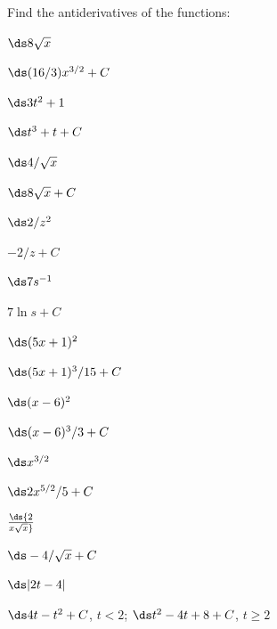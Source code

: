 \begin{enumialphparenastyle}

Find the antiderivatives of the functions:

\begin{ex}
 $\ds 8\sqrt{x}$
\begin{sol}
 $\ds (16/3)x^{3/2}+C$
\end{sol}
\end{ex}

\begin{ex}
 $\ds 3t^2+1$
\begin{sol}
 $\ds t^3+t+C$
\end{sol}
\end{ex}

\begin{ex}
 $\ds 4/\sqrt{x}$
\begin{sol}
 $\ds 8\sqrt{x}+C$
\end{sol}
\end{ex}

\begin{ex}
 $\ds 2/z^2$
\begin{sol}
 $-2/z+C$
\end{sol}
\end{ex}

\begin{ex}
 $\ds 7s^{-1}$
\begin{sol}
 $7\ln s+C$
\end{sol}
\end{ex}

\begin{ex}
 $\ds (5x+1)^2$
\begin{sol}
 $\ds (5x+1)^3/15+C$
\end{sol}
\end{ex}

\begin{ex}
 $\ds (x-6)^2$
\begin{sol}
 $\ds (x-6)^3/3+C$
\end{sol}
\end{ex}

\begin{ex}
 $\ds x^{3/2}$
\begin{sol}
 $\ds 2x^{5/2}/5+C$
\end{sol}
\end{ex}

\begin{ex}
 $\ds {2\over x\sqrt x}$
\begin{sol}
 $\ds -4/\sqrt{x}+C$
\end{sol}
\end{ex}

\begin{ex}
 $\ds |2t-4|$
\begin{sol}
 $\ds 4t-t^2+C$, $t<2$; $\ds t^2-4t+8+C$, $t\ge 2$
\end{sol}
\end{ex}

\end{enumialphparenastyle}
